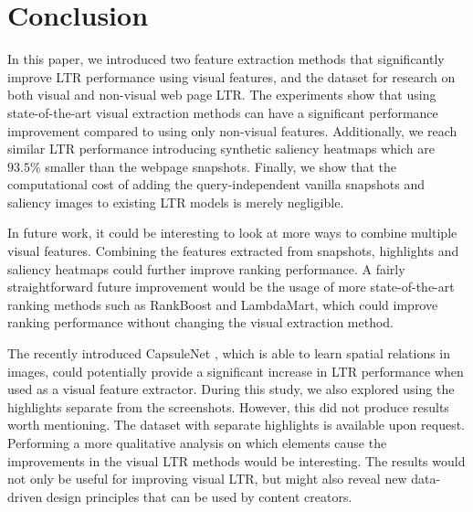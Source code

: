 
\section{Conclusion}
In this paper, we introduced two feature extraction methods that significantly improve \ac{LTR} performance using visual features, and the \datasetname{} dataset for research on both visual and non-visual web page \ac{LTR}.
The experiments show that using state-of-the-art visual extraction methods can have a significant performance improvement compared to using only non-visual features. Additionally, we reach similar \ac{LTR} performance introducing synthetic saliency heatmaps which are $93.5\%$ smaller than the webpage snapshots. Finally, we show that the computational cost of adding the query-independent vanilla snapshots and saliency images to existing \ac{LTR} models is merely negligible.


In future work, it could be interesting to look at more ways to combine multiple visual features. Combining the features extracted from snapshots, highlights and saliency heatmaps could further improve ranking performance. 
A fairly straightforward future improvement would be the usage of more state-of-the-art ranking methods such as RankBoost and LambdaMart, which could improve ranking performance without changing the visual extraction method.

The recently introduced CapsuleNet \cite{sabour2017dynamic}, which is able to learn spatial relations in images, could potentially provide a significant increase in \ac{LTR} performance when used as a visual feature extractor.  
During this study, we also explored using the highlights separate from the screenshots. 
However, this did not produce results worth mentioning. 
The dataset with separate highlights is available upon request. 
Performing a more qualitative analysis on which elements cause the improvements in the visual \ac{LTR} methods would be interesting. 
The results would not only be useful for improving visual \ac{LTR}, but might also reveal new data-driven design principles that can be used by content creators. 